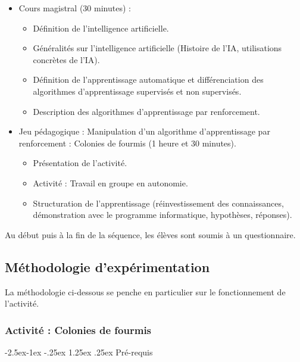 \documentclass[
12pt,
french,
]{article}
\makeatletter
\providecommand{\tightlist}{%
\setlength{\itemsep}{0pt}\setlength{\parskip}{0pt}}
\renewcommand\paragraph{\@startsection{paragraph}{4}{\z@}%
        {-2.5ex\@plus -1ex \@minus -.25ex}%
        {1.25ex \@plus .25ex}%
        {\normalfont\normalsize\bfseries}}
\makeatother
\begin{document}
\begin{itemize}
\item
  Cours magistral (30 minutes) :

  \begin{itemize}
  \item
    Définition de l'intelligence artificielle.
  \item
    Généralités sur l'intelligence artificielle (Histoire de l'IA,
    utilisations concrètes de l'IA).
  \item
    Définition de l'apprentissage automatique et différenciation des
    algorithmes d'apprentissage supervisés et non supervisés.
  \item
    Description des algorithmes d'apprentissage par renforcement.
  \end{itemize}
\item
  Jeu pédagogique : Manipulation d'un algorithme d'apprentissage par
  renforcement : Colonies de fourmis (1 heure et 30 minutes).

  \begin{itemize}
  \tightlist
  \item
    Présentation de l'activité.
  \item
    Activité : Travail en groupe en autonomie.
  \item
    Structuration de l'apprentissage (réinvestissement des
    connaissances, démonstration avec le programme informatique,
    hypothèses, réponses).
  \end{itemize}
\end{itemize}

Au début puis à la fin de la séquence, les élèves sont soumis à un
questionnaire.

\hypertarget{muxe9thodologie-dexpuxe9rimentation}{%
\subsection{Méthodologie
d'expérimentation}\label{muxe9thodologie-dexpuxe9rimentation}}

La méthodologie ci-dessous se penche en particulier sur le
fonctionnement de l'activité.

\hypertarget{activituxe9-colonies-de-fourmis}{%
\subsubsection{Activité : Colonies de
fourmis}\label{activituxe9-colonies-de-fourmis}}

\hypertarget{pruxe9-requis}{%
\paragraph{Pré-requis}\label{pruxe9-requis}}
\end{document}
